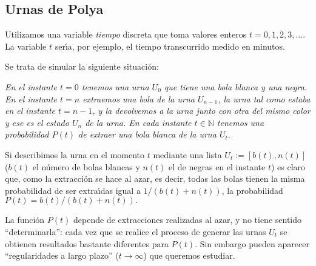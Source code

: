 \subsection{Urnas de Polya}

Utilizamos una variable {\itshape tiempo} discreta que toma valores enteros
$t=0,1,2,3,\dots$. La variable $t$ ser\'{\i}a, por ejemplo, el tiempo
transcurrido medido en minutos. 

Se trata de simular la siguiente situaci\'on:

{\itshape
En el instante $t=0$ tenemos una urna $U_0$ que tiene una bola blanca y una
negra. En el instante $t=n$ extraemos una bola de la urna $U_{n-1}$, la urna tal
 como estaba en el instante $t=n-1$,  y la devolvemos a la urna junto con otra
del mismo color y ese es el estado $U_n$ de la urna. En cada instante $t\in
\mathbb{N}$ tenemos una probabilidad $P(t)$ de extraer una bola blanca de la
urna $U_t.$ }

Si describimos la urna en el momento $t$ mediante una lista $U_t:=[b(t),n(t)]$
($b(t)$ el n\'umero de bolas blancas y $n(t)$ el de negras en el instante $t$)
es claro que, como la extracci\'on se hace al azar, es decir, todas las bolas
tienen la misma probabilidad de ser extra\'{\i}das igual a $1/(b(t)+n(t))$, la
probabilidad $P(t)=b(t)/(b(t)+n(t)).$ 

La funci\'on $P(t)$ depende de extracciones realizadas al azar, y no tiene
sentido ``determinarla'': cada vez que se realice el proceso de generar las
urnas $U_t$ se obtienen resultados bastante diferentes para $P(t)$. Sin embargo
pueden aparecer ``regularidades a largo plazo'' ($t\to \infty$) que 
queremos estudiar. 


